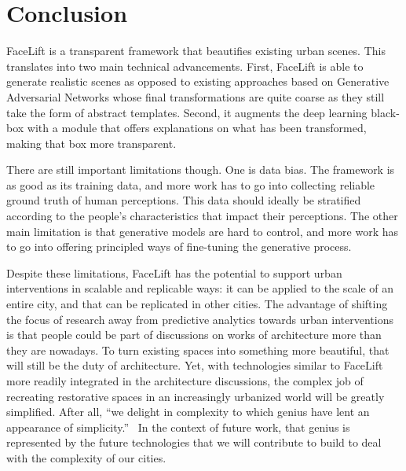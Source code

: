 \section{Conclusion}
\label{sec:discussion}

FaceLift is a transparent framework that beautifies existing urban scenes. This translates into two main technical advancements. First, FaceLift is able to generate realistic scenes as opposed to existing approaches based on  Generative Adversarial Networks whose final transformations are quite coarse as they still take the form of abstract templates.  Second, it augments the deep learning black-box with a module that offers explanations on what has been transformed, making that box more transparent. 

There are still important limitations though. One is data bias. The framework is as good as its training data, and more work has to go into collecting reliable ground truth of human perceptions. This data should ideally be stratified according to the people's characteristics that  impact their perceptions. The other main limitation is that generative models are hard to control, and more work has to go into offering principled ways of fine-tuning the generative process.

Despite these limitations, FaceLift has the potential to support urban interventions  in scalable  and replicable ways: it can be applied to the scale of an entire city, and that  can be replicated in other cities. The advantage of shifting the focus of research away from predictive analytics towards urban interventions is that people could be part of discussions on works of architecture  more than they are nowadays. To turn existing spaces into something more beautiful, that will still be the duty of architecture. Yet, with technologies similar to FaceLift more readily integrated in the architecture discussions, the complex job of recreating restorative spaces in an increasingly urbanized world will be greatly simplified.  After all, ``we delight in complexity to which genius have lent an appearance of simplicity.''~\cite{de2008architecture} In the context of future work, that genius is represented by the future technologies that we will contribute to build to deal with the complexity of our cities.




